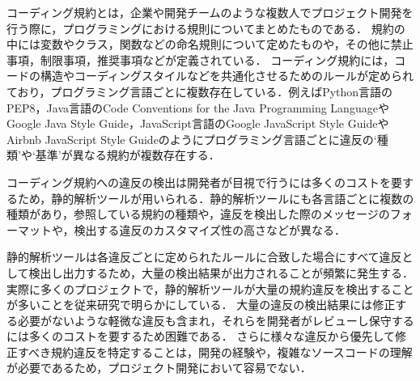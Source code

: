 \documentclass[submit,noauthor,ses,dvipdfmx]{ipsj}
\begin{document}
コーディング規約とは，企業や開発チームのような複数人でプロジェクト開発を行う際に，プログラミングにおける規則についてまとめたものである．
規約の中には変数やクラス，関数などの命名規則について定めたものや，その他に禁止事項，制限事項，推奨事項などが定義されている．
コーディング規約には，コードの構造やコーディングスタイルなどを共通化させるためのルールが定められており，プログラミング言語ごとに複数存在している．例えばPython言語のPEP8，Java言語のCode Conventions for the Java Programming LanguageやGoogle Java Style Guide，JavaScript言語のGoogle JavaScript Style GuideやAirbnb JavaScript Style Guideのようにプログラミング言語ごとに違反の`種類'や`基準'が異なる規約が複数存在する．


コーディング規約への違反の検出は開発者が目視で行うには多くのコストを要するため，静的解析ツールが用いられる．静的解析ツールにも各言語ごとに複数の種類があり，参照している規約の種類や，違反を検出した際のメッセージのフォーマットや，検出する違反のカスタマイズ性の高さなどが異なる．


静的解析ツールは各違反ごとに定められたルールに合致した場合にすべて違反として検出し出力するため，大量の検出結果が出力されることが頻繁に発生する．実際に多くのプロジェクトで，静的解析ツールが大量の規約違反を検出することが多いことを従来研究で明らかにしている\cite{UsingStaticAnalysisTools2}．
大量の違反の検出結果には修正する必要がないような軽微な違反も含まれ，それらを開発者がレビューし保守するには多くのコストを要するため困難である．
さらに様々な違反から優先して修正すべき規約違反を特定することは，開発の経験や，複雑なソースコードの理解が必要であるため，プロジェクト開発において容易でない\cite{shuseisarenai}．
\end{document}
